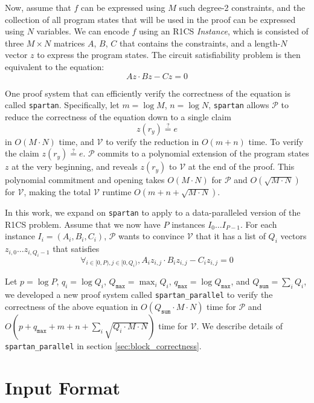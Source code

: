 \documentclass{article}
\newcommand{\code}{\texttt}
\newcommand{\Qsum}{Q_{\mathtt{sum}}}
\newcommand{\Qmax}{Q_{\mathtt{max}}}
\newcommand{\qmax}{q_{\mathtt{max}}}
\renewcommand{\P}{\mathcal{P}}
\newcommand{\V}{\mathcal{V}}
\newcommand{\eqq}{\stackrel{?}{=}}
\begin{document}
Now, assume that $f$ can be expressed using $M$ such degree-2 constraints, and the collection of all program states that will be used in the proof can be expressed using $N$ variables. We can encode $f$ using an R1CS \emph{Instance}, which is consisted of three $M\times N$ matrices $A$, $B$, $C$ that contains the constraints, and a length-$N$ vector $z$ to express the program states. The circuit satisfiability problem is then equivalent to the equation:
$$Az \cdot Bz - Cz = 0$$

One proof system that can efficiently verify the correctness of the equation is called \code{spartan}. Specifically, let $m = \log M$, $n = \log N$, \code{spartan} allows $\P$ to reduce the correctness of the equation down to a single claim
$$z(r_y) \eqq e$$
in $O(M\cdot N)$ time, and $\V$ to verify the reduction in $O(m + n)$ time. To verify the claim $z(r_y) \eqq e$. $\P$ commits to a polynomial extension of the program states $z$ at the very beginning, and reveals $z(r_y)$ to $\V$ at the end of the proof. This polynomial commitment and opening takes $O(M\cdot N)$ for $\P$ and $O(\sqrt{M\cdot N})$ for $\V$, making the total $\V$ runtime $O(m + n + \sqrt{M\cdot N})$. 

In this work, we expand on \code{spartan} to apply to a data-paralleled version of the R1CS problem. Assume that we now have $P$ instances $I_0\dots I_{P-1}$. For each instance $I_i = (A_i, B_i, C_i)$, $\P$ wants to convince $\V$ that it has a list of $Q_i$ vectors $z_{i, 0}\dots z_{i, Q_i-1}$ that satisfies
$$\forall_{i\in [0, P), j \in [0, Q_i)}, A_iz_{i, j} \cdot B_iz_{i, j} - C_iz_{i, j} = 0$$

Let $p = \log P$, $q_i = \log Q_i$, $\Qmax = \max_i Q_i$, $\qmax = \log \Qmax$, and $\Qsum = \sum_i Q_i$, we developed a new proof system called \code{spartan\_parallel} to verify the correctness of the above equation in $O(\Qsum \cdot M \cdot N)$ time for $\P$ and $O(p + \qmax + m + n + \sum_i \sqrt{Q_i\cdot M\cdot N})$ time for $\V$. We describe details of \code{spartan\_parallel} in section \ref{sec:block_correctness}.


\section{Input Format}\label{sec:input}
\end{document}

